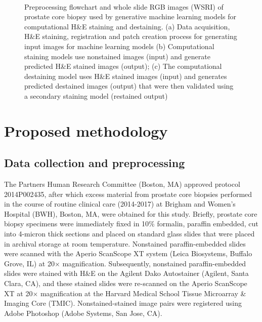 \documentclass[10pt, conference, compsocconf]{IEEEtran}
\begin{document}
\begin{figure*}[ht]
	 \\
    \hfill
    \vline
    \hfill
  	\caption{Preprocessing flowchart and whole slide RGB images (WSRI) of prostate core biopsy used by generative machine learning models for computational H\&E staining and destaining. (a) Data acquisition, H\&E staining, registration and patch creation process for generating input images for machine learning models (b) Computational staining models use nonstained images (input) and generate predicted H\&E stained images (output); (c) The computational destaining model uses H\&E stained images (input) and generates predicted destained images (output) that were then validated using a secondary staining model (restained output)}
\end{figure*}

\section{Proposed methodology}
\subsection{Data collection and preprocessing}
The Partners Human Research Committee (Boston, MA) approved protocol 2014P002435, after which excess material from prostate core biopsies performed in the course of routine clinical care (2014-2017) at Brigham and Women's Hospital (BWH), Boston, MA, were obtained for this study. Briefly, prostate core biopsy specimens were immediately fixed in 10\% formalin, paraffin embedded, cut into 4-micron thick sections and placed on standard glass slides that were placed in archival storage at room temperature. Nonstained paraffin-embedded slides were scanned with the Aperio ScanScope XT system (Leica Biosystems, Buffalo Grove, IL) at 20$\times$ magnification. Subsequently, nonstained paraffin-embedded slides were stained with H\&E on the Agilent Dako Autostainer (Agilent, Santa Clara, CA), and these stained slides were re-scanned on the Aperio ScanScope XT at 20$\times$ magnification at the Harvard Medical School Tissue Microarray \& Imaging Core (TMIC). Nonstained-stained image pairs were registered using Adobe Photoshop (Adobe Systems, San Jose, CA).
\end{document}
